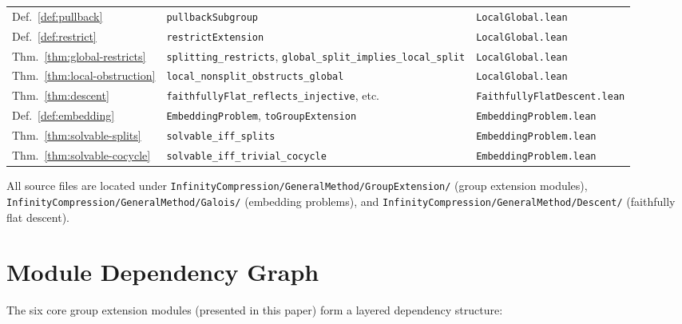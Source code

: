 \documentclass[11pt]{article}
\newcommand{\lean}[1]{\texttt{#1}}
\begin{document}
\begin{longtable}{@{}>{\raggedright\arraybackslash}p{}
  >{\raggedright\arraybackslash}p{}
  >{\raggedright\arraybackslash}p{}@{}}
Def.~\ref{def:pullback} &
  \lean{pullbackSubgroup} &
  \lean{LocalGlobal.lean} \\

Def.~\ref{def:restrict} &
  \lean{restrictExtension} &
  \lean{LocalGlobal.lean} \\

Thm.~\ref{thm:global-restricts} &
  \lean{splitting\_restricts}, \lean{global\_split\_implies\_local\_split} &
  \lean{LocalGlobal.lean} \\

Thm.~\ref{thm:local-obstruction} &
  \lean{local\_nonsplit\_obstructs\_global} &
  \lean{LocalGlobal.lean} \\

Thm.~\ref{thm:descent} &
  \lean{faithfullyFlat\_reflects\_injective}, etc. &
  \lean{FaithfullyFlatDescent.lean} \\

Def.~\ref{def:embedding} &
  \lean{EmbeddingProblem}, \lean{toGroupExtension} &
  \lean{EmbeddingProblem.lean} \\

Thm.~\ref{thm:solvable-splits} &
  \lean{solvable\_iff\_splits} &
  \lean{EmbeddingProblem.lean} \\

Thm.~\ref{thm:solvable-cocycle} &
  \lean{solvable\_iff\_trivial\_cocycle} &
  \lean{EmbeddingProblem.lean} \\

\end{longtable}

\noindent
All source files are located under
\lean{InfinityCompression/GeneralMethod/GroupExtension/} (group extension modules),
\lean{InfinityCompression/GeneralMethod/Galois/} (embedding problems),
and \lean{InfinityCompression/GeneralMethod/Descent/} (faithfully flat descent).

\section{Module Dependency Graph}\label{app:deps}

The six core group extension modules (presented in this paper) form a layered
dependency structure:
\end{document}
